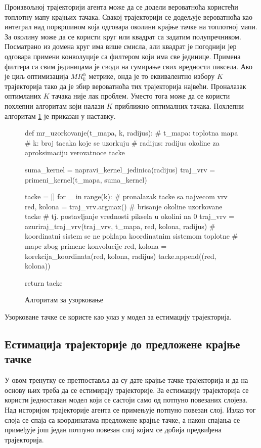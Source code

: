 \documentclass[11pt,oneside]{memoir}
\begin{document}
Произвољној трајекторији агента може да се додели вероватноћа користећи топлотну мапу крајњих тачака. Свакој трајекторији се додељује вероватноћа
као интеграл над порвршином која одговара околини крајње тачке на топлотној мапи. За околину може да се користи круг или квадрат са задатим 
полупречником. Посматрано из домена круг има више смисла, али квадрат је погоднији јер одговара примени конволуције са филтером који има све јединице.
Примена филтера са свим јединицама је своди на сумирање свих вредности пиксела.
Ако је циљ оптимизација $MR^{\alpha}_{k}$ метрике, онда је то еквивалентно избору $K$ трајекторија тако да је збир вероватноћа 
тих трајекторија највећи. 
Проналазак оптимланих $K$ тачака није лак проблем. Уместо тога може да се користи похлепни алгоритам који налази $K$ приближно оптималних
тачака. Похлепни алгоритам \ref{home-sampling-mr} је приказан у наставку.

\begin{figure}[H]
  \begin{python}
  def mr_uzorkovanje(t_mapa, k, radijus):
    # t_mapa: toplotna mapa
    # k: broj tacaka koje se uzorkuju
    # radijus: radijus okoline za aproksimaciju verovatnoce tacke

    suma_kernel = napravi_kernel_jedinica(radijus)
    traj_vrv = primeni_kernel(t_mapa, suma_kernel)
    
    tacke = []
    for _ in range(k):
      # pronalazak tacke sa najvecom vrv
      red, kolona = traj_vrv.argmax()  
      # brisanje okoline uzorkovane tacke
      # tj. postavljanje vrednosti piksela u okolini na 0
      traj_vrv = azuriraj_traj_vrv(traj_vrv, t_mapa, red, kolona, radijus)
      # koordinatni sistem se ne poklapa koordinatnim sistemom toplotne 
      # mape zbog primene konvolucije
      red, kolona = korekcija_koordinata(red, kolona, radijus)
      tacke.append((red, kolona))

    return tacke
  \end{python}
  \caption{Алгоритам за узорковање\label{home-sampling-mr}}
\end{figure}

Узорковане тачке се користе као улаз у модел за естимацију трајекторија.
  
\subsection{Естимација трајекторије до предложене крајње тачке}

У овом тренутку се претпоставља да су дате крајње тачке трајекторија и да на основу њих треба да се естимирају трајекторије. За естимацију
трајекторија се користи једноставан модел који се састоји само од потпуно повезаних слојева. Над историјом трајекторије агента се
примењује потпуно повезан слој. Излаз тог слоја се спаја са координатама предложене крајње тачке, а након спајања се примеђује још један
потпуно повезан слој којим се добија предвиђена трајекторија.
\end{document}
